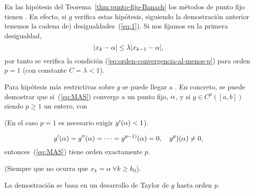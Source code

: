 \begin{remark}
   En las hipótesis del Teorema~\ref{thm:punto-fijo-Banach} los
    métodos de punto fijo tienen .  En efecto, si $g$ verifica estas hipótesis,
    siguiendo la demostración anterior tenemos la cadena de)
    desigualdades~(\ref{eq:1}). Si nos fijamos en la primera
    desigualdad,
    $$
    |x_k-\alpha|\le\lambda |x_{k-1}-\alpha|,
    $$
    por tanto se verifica la condición
    (\ref{eq:orden-convergencia-al-menos-p}) para orden $p=1$ (con
    constante $C=\lambda<1$).
  \end{remark}    
  \begin{remark}
    Para hipótesis más restrictivas sobre $g$ se puede llegar a
    . En concreto, se puede demostrar
    que si~(\ref{eq:MAS}) converge a un punto fijo, $\alpha$, y si
    $g\in C^p([a,b])$ siendo $p \ge 1$ un entero, con
    \begin{extension}
      (En el caso $p=1$ es necesario exigir $g'(\alpha)<1$).
    \end{extension}
    \begin{equation*}
      g'(\alpha)=g''(\alpha)=\cdots=g^{p-1)}(\alpha)=0, \quad
      g^p)(\alpha)\neq 0,
    \end{equation*}
    entonces~(\ref{eq:MAS}) tiene orden exactamente $p$.
    \begin{extension}
      (Siempre que no ocurra que $x_k=\alpha\ \forall k\ge k_0$).
    \end{extension}
    La demostración se basa en un desarrollo de Taylor de $g$ hasta
    orden $p$.
    \label{rk:MAS.orden.p}
  \end{remark}

